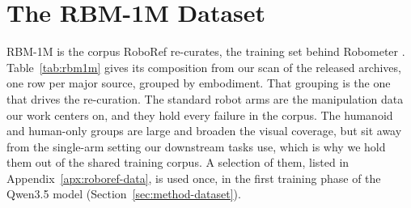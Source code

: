 \onecolumn

\chapter{The RBM-1M Dataset}
\label{apx:rbm1m}

RBM-1M is the corpus RoboRef re-curates, the training set behind Robometer \citep{robometer}. Table~\ref{tab:rbm1m} gives its composition from our scan of the released archives, one row per major source, grouped by embodiment. That grouping is the one that drives the re-curation. The standard robot arms are the manipulation data our work centers on, and they hold every failure in the corpus. The humanoid and human-only groups are large and broaden the visual coverage, but sit away from the single-arm setting our downstream tasks use, which is why we hold them out of the shared training corpus. A selection of them, listed in Appendix~\ref{apx:roboref-data}, is used once, in the first training phase of the Qwen3.5 model (Section~\ref{sec:method-dataset}).

